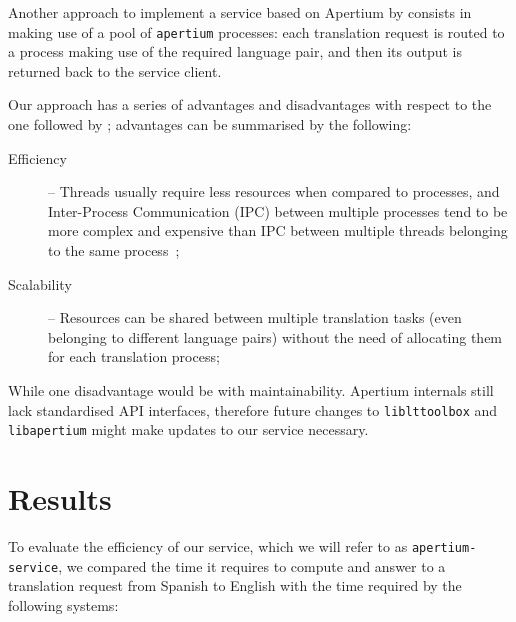 \documentclass[11pt]{article}
\begin{document}
Another approach to implement a service based on Apertium by \cite{sanchez-cartagena2009scalable} 
consists in making use of a pool of {\tt\small apertium} processes: each translation request is 
routed to a process making use of the required language pair, and then its output is returned 
back to the service client.

Our approach has a series of advantages and disadvantages with respect to the one followed 
by \cite{sanchez-cartagena2009scalable}; advantages can be summarised by the following:

\begin{description}
 \item[Efficiency] -- Threads usually require less resources when compared to processes, and 
    Inter-Process Communication (IPC) between multiple processes tend to be more complex and 
    expensive than IPC between multiple threads belonging to the same process~\citep{tanenbaum};
 \item[Scalability] -- Resources can be shared between multiple translation tasks (even 
    belonging to different language pairs) without the need of allocating them for each 
    translation process;
\end{description}

While one disadvantage would be with maintainability. Apertium internals still lack 
standardised API interfaces, therefore 
future changes to {\small\tt liblttoolbox} and {\small\tt libapertium} might make updates to 
our service necessary.

\section{Results}

To evaluate the efficiency of our service, which we will refer to as {\tt\small apertium-service}, we compared the time it requires to compute and answer to a translation request from Spanish to English with the time required by the following systems:
\end{document}
